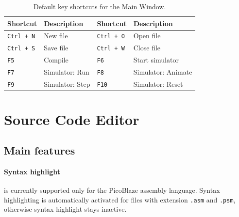             \begin{table}[h!]
                \centering
                \fontsize{8pt}{9pt}
                {
                    \begin{tabular}{|l|l|l|l|}
                        \hline
                        \textbf{Shortcut}               & \textbf{Description}          &
                        \textbf{Shortcut}               & \textbf{Description}          \\\hline
                        \texttt{Ctrl + N}               & New file                      &
                        \texttt{Ctrl + O}               & Open file                     \\
                        \texttt{Ctrl + S}               & Save file                     &
                        \texttt{Ctrl + W}               & Close file                    \\
                        \texttt{F5}                     & Compile                       &
                        \texttt{F6}                     & Start simulator               \\
                        \texttt{F7}                     & Simulator: Run                &
                        \texttt{F8}                     & Simulator: Animate            \\
                        \texttt{F9}                     & Simulator: Step               &
                        \texttt{F10}                    & Simulator: Reset              \\
                        \hline
                    \end{tabular}
                }
                \caption{Default key shortcuts for the Main Window.}
            \end{table}

\clearpage
\section{Source Code Editor}
    \subsection{Main features}
        \paragraph{Syntax highlight} is currently supported only for the PicoBlaze assembly language. Syntax highlighting is automatically activated for files with extension \texttt{.asm} and \texttt{.psm}, otherwise syntax highlight stays inactive.

